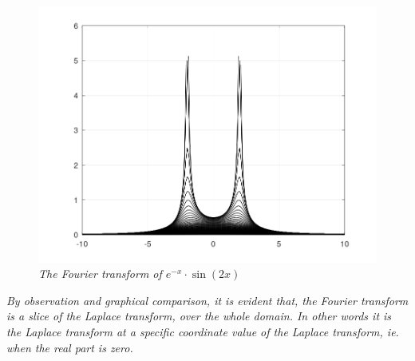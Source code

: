 
			\begin{figure}[H]
			\centering
			\includegraphics[width=15cm]{FouPictures/bk.png}
    		\caption{\textit{The Fourier transform of $e^{-x}\cdot\sin\left(2x\right)$}}
			\end{figure}

		\textit{By observation and graphical comparison, it is evident that, the Fourier transform is a slice of the Laplace transform, over the whole domain. In other words it is the Laplace transform at a specific coordinate value of the Laplace transform, ie. when the real part is zero.}





